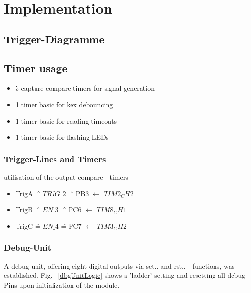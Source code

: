 \documentclass[master,english,smartquotes,apa]{hgbthesis}
\begin{document}
		
		
	\chapter{Implementation}
	\label{cha:Implementation}
		\section{Trigger-Diagramme}
		\section{Timer usage}
			\begin{itemize} \setlength\itemsep{1px}
			\item 3 capture compare timers for signal-generation
			\item 1 timer basic for kex debouncing 
			\item 1 timer basic for reading timeouts
			\item 1 timer basic for flashing LEDs
			\end{itemize}
		\subsection{Trigger-Lines and Timers}
		utilisation of the output compare - timers
		\begin{itemize}
			\item TrigA \^{=} $TRIG\_2$  \^{=} PB3 $\leftarrow$ $TIM2_CH2$
			\item TrigB \^{=} $EN\_3$    \^{=} PC6 $\leftarrow$ $TIM8_CH1$
			\item TrigC \^{=} $EN\_4$    \^{=} PC7 $\leftarrow$ $TIM3_CH2$
		\end{itemize}
		\subsection{Debug-Unit}
		A debug-unit, offering eight digital outputs via set.. and rst.. - functions, was established. Fig. ~\ref{dbgUnitLogic} shows a 'ladder' setting and resetting all debug-Pins upon initialization of the module.
		
\end{document}
